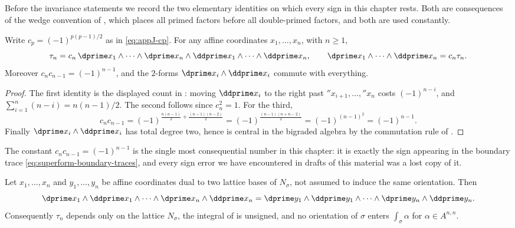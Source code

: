Before the invariance statements we record the two elementary identities on
which every sign in this chapter rests.  Both are consequences of the wedge
convention of , which places all primed factors before
all double-primed factors, and both are used constantly.

\begin{lemma}
\label{lem:ch11-interlaced-grouped}
Write $c_p=(-1)^{p(p-1)/2}$ as in \eqref{eq:appJ-cp}.  For any affine
coordinates $x_1,\ldots,x_n$, with $n\ge1$,
\[
 \tau_n
 =c_n\,\dprime x_1\wedge\cdots\wedge\dprime x_n
      \wedge\ddprime x_1\wedge\cdots\wedge\ddprime x_n,
 \qquad
 \dprime x_1\wedge\cdots\wedge\ddprime x_n=c_n\tau_n .
\]
Moreover $c_nc_{n-1}=(-1)^{n-1}$, and the $2$-forms
$\dprime x_i\wedge\ddprime x_i$ commute with everything.
\end{lemma}

\begin{proof}
The first identity is the displayed count in : moving
$\ddprime x_i$ to the right past $\dprime x_{i+1},\ldots,\dprime x_n$ costs
$(-1)^{n-i}$, and $\sum_{i=1}^{n}(n-i)=n(n-1)/2$.  The second follows since
$c_n^2=1$.  For the third,
\[
 c_nc_{n-1}
 =(-1)^{\frac{n(n-1)}2+\frac{(n-1)(n-2)}2}
 =(-1)^{\frac{(n-1)(n+n-2)}2}
 =(-1)^{(n-1)^2}
 =(-1)^{n-1}.
\]
Finally $\dprime x_i\wedge\ddprime x_i$ has total degree two, hence is
central in the bigraded algebra by the commutation rule of
.
\end{proof}

The constant $c_nc_{n-1}=(-1)^{n-1}$ is the single most consequential
number in this chapter: it is exactly the sign appearing in the boundary
trace \eqref{eq:superform-boundary-traces}, and every sign error we have
encountered in drafts of this material was a lost copy of it.

\begin{lemma}
\label{lem:ch11-orientation-drops-out}
Let $x_1,\ldots,x_n$ and $y_1,\ldots,y_n$ be affine coordinates dual to two
lattice bases of $N_\sigma$, not assumed to induce the same orientation.
Then
\[
 \dprime x_1\wedge\ddprime x_1\wedge\cdots
   \wedge\dprime x_n\wedge\ddprime x_n
 =\dprime y_1\wedge\ddprime y_1\wedge\cdots
   \wedge\dprime y_n\wedge\ddprime y_n .
\]
Consequently $\tau_n$ depends only on the lattice $N_\sigma$, the integral
of  is unsigned, and no orientation of
$\sigma$ enters $\int_\sigma\alpha$ for $\alpha\in A^{n,n}$.
\end{lemma}

